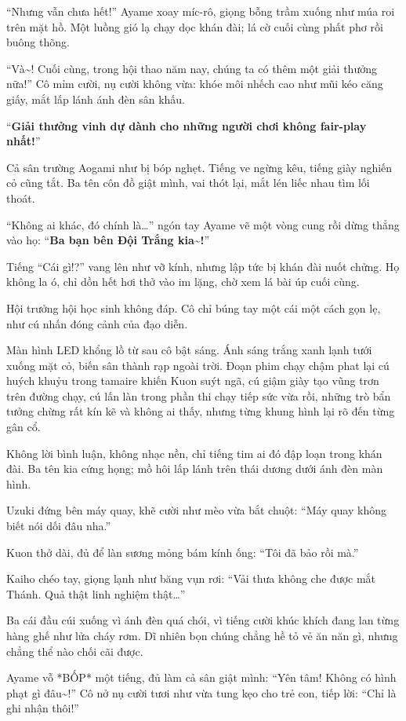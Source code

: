 \documentclass[../main.tex]{subfiles}
\begin{document}
``Nhưng vẫn chưa hết!'' Ayame xoay míc-rô, giọng bỗng trầm xuống như múa roi trên mặt hồ. Một luồng gió lạ chạy dọc khán đài; lá cờ cuối cùng phất phơ rồi buông thõng.

``Và\~{}! Cuối cùng, trong hội thao năm nay, chúng ta có thêm một giải thưởng nữa!'' Cô mỉm cười, nụ cười không vừa: khóe môi nhếch cao như mũi kéo căng giấy, mắt lấp lánh ánh đèn sân khấu.

``\textbf{Giải thưởng vinh dự dành cho những người chơi không fair-play nhất!}''

Cả sân trường Aogami như bị bóp nghẹt. Tiếng ve ngừng kêu, tiếng giày nghiến cỏ cũng tắt. Ba tên côn đồ giật mình, vai thót lại, mắt lén liếc nhau tìm lối thoát.

``Không ai khác, đó chính là\dots'' ngón tay Ayame vẽ một vòng cung rồi dừng thẳng vào họ: ``\textbf{Ba bạn bên Đội Trắng kia\~{}!}''

Tiếng ``Cái gì!?'' vang lên như vỡ kính, nhưng lập tức bị khán đài nuốt chửng. Họ không la ó, chỉ dồn hết hơi thở vào im lặng, chờ xem lá bài úp cuối cùng.

Hội trưởng hội học sinh không đáp. Cô chỉ búng tay một cái một cách gọn lẹ, như cú nhấn đóng cảnh của đạo diễn.

Màn hình LED khổng lồ từ sau cô bật sáng. Ánh sáng trắng xanh lạnh tưới xuống mặt cỏ, biến sân thành rạp ngoài trời. Đoạn phim chạy chậm phat lại cú huých khuỷu trong tamaire khiến Kuon suýt ngã, cú giậm giày tạo vũng trơn trên đường chạy, cú lấn làn trong phần thi chạy tiếp sức vừa rồi, những trò bẩn tưởng chừng rất kín kẽ và không ai thấy, nhưng từng khung hình lại rõ đến từng gân cổ.

Không lời bình luận, không nhạc nền, chỉ tiếng tim ai đó đập loạn trong khán đài. Ba tên kia cứng họng; mồ hôi lấp lánh trên thái dương dưới ánh đèn màn hình.

Uzuki đứng bên máy quay, khẽ cười như mèo vừa bắt chuột: ``Máy quay không biết nói dối đâu nha.''

Kuon thở dài, đủ để làn sương mỏng bám kính ống: ``Tôi đã bảo rồi mà.''

Kaiho chéo tay, giọng lạnh như băng vụn rơi: ``Vải thưa không che được mắt Thánh. Quả thật linh nghiệm thật\dots''

Ba cái đầu cúi xuống vì ánh đèn quá chói, vì tiếng cười khúc khích đang lan từng hàng ghế như lửa cháy rơm. Dĩ nhiên bọn chúng chẳng hề tỏ vẻ ăn năn gì, nhưng chẳng thể nào chối cãi được.

Ayame vỗ *BỐP* một tiếng, đủ làm cả sân giật mình: ``Yên tâm! Không có hình phạt gì đâu\~{}!'' Cô nở nụ cười tươi như vừa tung kẹo cho trẻ con, tiếp lời: ``Chỉ là ghi nhận thôi!''
\end{document}
